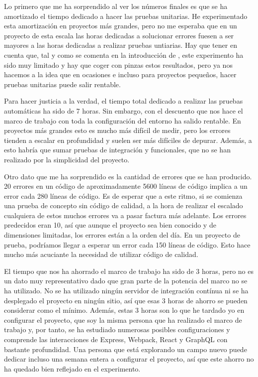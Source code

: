 Lo primero que me ha sorprendido al ver los números finales es que se ha amortizado el tiempo dedicado a hacer las pruebas unitarias. He experimentado esta amortización en proyectos más grandes, pero no me esperaba que en un proyecto de esta escala las horas dedicadas a solucionar errores fuesen a ser mayores a las horas dedicadas a realizar pruebas untiarias. Hay que tener en cuenta que, tal y como se comenta en la introducción de , este experimento ha sido muy limitado y hay que coger con pinzas estos resultados, pero ya nos hacemos a la idea que en ocasiones e incluso para proyectos pequeños, hacer pruebas unitarias puede salir rentable.

Para hacer justicia a la verdad, el tiempo total dedicado a realizar las pruebas automáticas ha sido de 7 horas. Sin embargo, con el descuento que nos hace el marco de trabajo con toda la configuración del entorno ha salido rentable. En proyectos más grandes esto es mucho más difícil de medir, pero los errores tienden a escalar en profundidad y suelen ser más difíciles de depurar. Además, a esto habría que sumar pruebas de integración y funcionales, que no se han realizado por la simplicidad del proyecto.

Otro dato que me ha sorprendido es la cantidad de errores que se han producido. 20 errores en un código de aproximadamente 5600 líneas de código implica a un error cada 280 líneas de código. Es de esperar que a este ritmo, si se comienza una prueba de concepto sin código de calidad, a la hora de realizar el escalado cualquiera de estos muchos errores va a pasar factura más adelante. Los errores predecidos eran 10, así que aunque el proyecto sea bien conocido y de dimensiones limitadas, los errores están a la orden del día. En un proyecto de prueba, podríamos llegar a esperar un error cada 150 líneas de código. Esto hace mucho más acuciante la necesidad de utilizar código de calidad.

El tiempo que nos ha ahorrado el marco de trabajo ha sido de 3 horas, pero no es un dato muy representativo dado que gran parte de la potencia del marco no se ha utilizado. No se ha utilizado ningún servidor de integración contínua ni se ha desplegado el proyecto en ningún sitio, así que esas 3 horas de ahorro se pueden considerar como el mínimo. Además, estas 3 horas son lo que he tardado yo en configurar el proyecto, que soy la misma persona que ha realizado el marco de trabajo y, por tanto, se ha estudiado numerosas posibles configuraciones y comprende las interacciones de Express, Webpack, React y GraphQL con bastante profundidad. Una persona que está explorando un campo nuevo puede dedicar incluso una semana entera a configurar el proyecto, así que este ahorro no ha quedado bien reflejado en el experimento.

